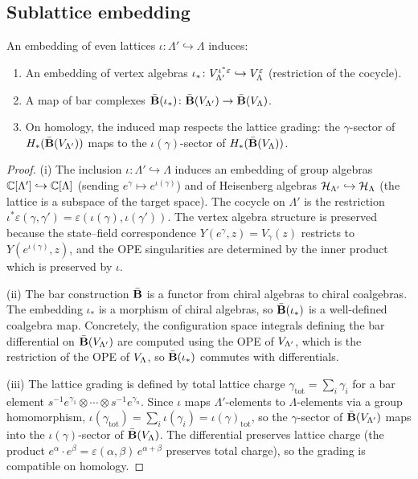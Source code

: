 \subsection{Sublattice embedding}

\begin{proposition}\label{prop:lattice:sublattice}
An embedding of even lattices $\iota \colon \Lambda' \hookrightarrow \Lambda$
induces:
\begin{enumerate}[label=(\roman*)]
\item An embedding of vertex algebras
  $\iota_* \colon V_{\Lambda'}^{\iota^*\varepsilon}
  \hookrightarrow V_\Lambda^\varepsilon$
  (restriction of the cocycle).
\item A map of bar complexes
  $\bar{\mathbf{B}}(\iota_*) \colon
  \bar{\mathbf{B}}(V_{\Lambda'}) \to \bar{\mathbf{B}}(V_\Lambda)$.
\item On homology, the induced map respects the lattice grading:
  the $\gamma$-sector of $H_*(\bar{\mathbf{B}}(V_{\Lambda'}))$ maps to
  the $\iota(\gamma)$-sector of $H_*(\bar{\mathbf{B}}(V_\Lambda))$.
\end{enumerate}
\end{proposition}

\begin{proof}
(i) The inclusion $\iota \colon \Lambda' \hookrightarrow \Lambda$
induces an embedding of group algebras
$\mathbb{C}[\Lambda'] \hookrightarrow \mathbb{C}[\Lambda]$
(sending $e^\gamma \mapsto e^{\iota(\gamma)}$) and of Heisenberg
algebras $\mathcal{H}_{\Lambda'} \hookrightarrow \mathcal{H}_\Lambda$
(the lattice is a subspace of the target space).
The cocycle on $\Lambda'$ is the restriction
$\iota^*\varepsilon(\gamma, \gamma') = \varepsilon(\iota(\gamma),\iota(\gamma'))$.
The vertex algebra structure is preserved because
the state--field correspondence $Y(e^\gamma, z) = V_\gamma(z)$
restricts to $Y(e^{\iota(\gamma)}, z)$, and the OPE singularities
are determined by the inner product which is preserved by $\iota$.

(ii) The bar construction $\bar{\mathbf{B}}$ is a functor from chiral algebras to
chiral coalgebras.  The embedding $\iota_*$ is a morphism of chiral
algebras, so $\bar{\mathbf{B}}(\iota_*)$ is a well-defined coalgebra map.
Concretely, the configuration space integrals defining the bar
differential on $\bar{\mathbf{B}}(V_{\Lambda'})$ are computed using the
OPE of $V_{\Lambda'}$, which is the restriction of the OPE of
$V_\Lambda$, so $\bar{\mathbf{B}}(\iota_*)$ commutes with differentials.

(iii) The lattice grading is defined by total lattice charge
$\gamma_{\mathrm{tot}} = \sum_i \gamma_i$ for a bar element
$s^{-1}e^{\gamma_1} \otimes \cdots \otimes s^{-1}e^{\gamma_n}$.
Since $\iota$ maps $\Lambda'$-elements to $\Lambda$-elements via a
group homomorphism,
$\iota(\gamma_{\mathrm{tot}}) = \sum_i \iota(\gamma_i) = \iota(\gamma)_{\mathrm{tot}}$,
so the $\gamma$-sector of $\bar{\mathbf{B}}(V_{\Lambda'})$ maps into the
$\iota(\gamma)$-sector of $\bar{\mathbf{B}}(V_\Lambda)$.
The differential preserves lattice charge (the product
$e^\alpha \cdot e^\beta = \varepsilon(\alpha,\beta)\,e^{\alpha+\beta}$
preserves total charge), so the grading is compatible on homology.
\end{proof}

